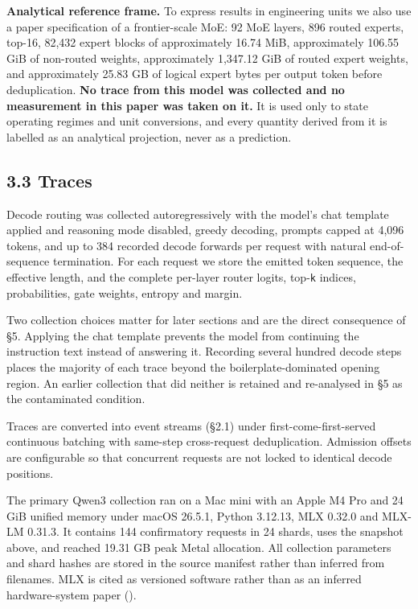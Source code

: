 \documentclass[
  10pt,
  letterpaper,
  10pt]{article}
\begin{document}
\textbf{Analytical reference frame.} To express results in engineering
units we also use a paper specification of a frontier-scale MoE: 92 MoE
layers, 896 routed experts, top-16, 82,432 expert blocks of
approximately 16.74 MiB, approximately 106.55 GiB of non-routed weights,
approximately 1,347.12 GiB of routed expert weights, and approximately
25.83 GB of logical expert bytes per output token before deduplication.
\textbf{No trace from this model was collected and no measurement in
this paper was taken on it.} It is used only to state operating regimes
and unit conversions, and every quantity derived from it is labelled as
an analytical projection, never as a prediction.

\subsection{3.3 Traces}\label{traces}

Decode routing was collected autoregressively with the model's chat
template applied and reasoning mode disabled, greedy decoding, prompts
capped at 4,096 tokens, and up to 384 recorded decode forwards per
request with natural end-of-sequence termination. For each request we
store the emitted token sequence, the effective length, and the complete
per-layer router logits, top-\texttt{k} indices, probabilities, gate
weights, entropy and margin.

Two collection choices matter for later sections and are the direct
consequence of §5. Applying the chat template prevents the model from
continuing the instruction text instead of answering it. Recording
several hundred decode steps places the majority of each trace beyond
the boilerplate-dominated opening region. An earlier collection that did
neither is retained and re-analysed in §5 as the contaminated condition.

Traces are converted into event streams (§2.1) under
first-come-first-served continuous batching with same-step cross-request
deduplication. Admission offsets are configurable so that concurrent
requests are not locked to identical decode positions.

The primary Qwen3 collection ran on a Mac mini with an Apple M4 Pro and
24 GiB unified memory under macOS 26.5.1, Python 3.12.13, MLX 0.32.0 and
MLX-LM 0.31.3. It contains 144 confirmatory requests in 24 shards, uses
the snapshot above, and reached 19.31 GB peak Metal allocation. All
collection parameters and shard hashes are stored in the source manifest
rather than inferred from filenames. MLX is cited as versioned software
rather than as an inferred hardware-system paper
().
\end{document}
